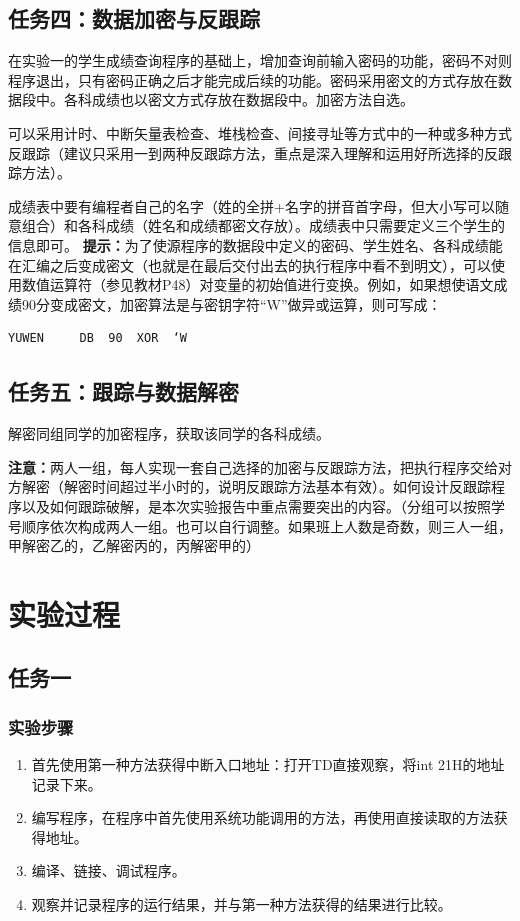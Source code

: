 \documentclass{article}
\newenvironment{codeFont}{\codeF}{\par}
\begin{document}
	\subsection[任务四]{任务四：数据加密与反跟踪}
	在实验一的学生成绩查询程序的基础上，增加查询前输入密码的功能，密码不对则程序退出，只有密码正确之后才能完成后续的功能。密码采用密文的方式存放在数据段中。各科成绩也以密文方式存放在数据段中。加密方法自选。\par
	可以采用计时、中断矢量表检查、堆栈检查、间接寻址等方式中的一种或多种方式反跟踪（建议只采用一到两种反跟踪方法，重点是深入理解和运用好所选择的反跟踪方法）。\par
	成绩表中要有编程者自己的名字（姓的全拼+名字的拼音首字母，但大小写可以随意组合）和各科成绩（姓名和成绩都密文存放）。成绩表中只需要定义三个学生的信息即可。
	\textbf{提示：}为了使源程序的数据段中定义的密码、学生姓名、各科成绩能在汇编之后变成密文（也就是在最后交付出去的执行程序中看不到明文），可以使用数值运算符（参见教材P48）对变量的初始值进行变换。例如，如果想使语文成绩90分变成密文，加密算法是与密钥字符“W”做异或运算，则可写成：
	\begin{codeFont}
		\begin{lstlisting}[gobble=12]
			YUWEN     DB  90  XOR  ‘W
		\end{lstlisting}
	\end{codeFont}

	\subsection[任务五]{任务五：跟踪与数据解密}
	解密同组同学的加密程序，获取该同学的各科成绩。\par
	\textbf{注意：}两人一组，每人实现一套自己选择的加密与反跟踪方法，把执行程序交给对方解密（解密时间超过半小时的，说明反跟踪方法基本有效）。如何设计反跟踪程序以及如何跟踪破解，是本次实验报告中重点需要突出的内容。（分组可以按照学号顺序依次构成两人一组。也可以自行调整。如果班上人数是奇数，则三人一组，甲解密乙的，乙解密丙的，丙解密甲的）

	\section{实验过程}
	\subsection{任务一}
	\subsubsection{实验步骤}
	\begin{enumerate}
		\item 首先使用第一种方法获得中断入口地址：打开TD直接观察，将int 21H的地址记录下来。
		\item 编写程序，在程序中首先使用系统功能调用的方法，再使用直接读取的方法获得地址。
		\item 编译、链接、调试程序。
		\item 观察并记录程序的运行结果，并与第一种方法获得的结果进行比较。
	\end{enumerate}
\end{document}
